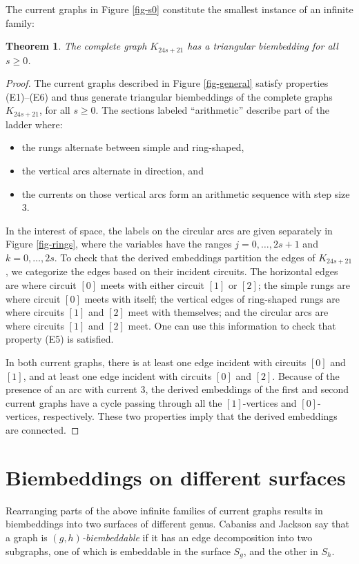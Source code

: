 \documentclass[12pt]{article}
\theoremstyle{plain}
\newtheorem{theorem}{Theorem}[section]
\begin{document}
The current graphs in Figure \ref{fig-s0} constitute the smallest instance of an infinite family:

\begin{theorem}
The complete graph $K_{24s+21}$ has a triangular biembedding for all $s \geq 0$.
\label{thm-main}
\end{theorem}
\begin{proof}
The current graphs described in Figure \ref{fig-general} satisfy properties (E1)--(E6) and thus generate triangular biembeddings of the complete graphs $K_{24s+21}$, for all $s \geq 0$. The sections labeled ``arithmetic'' describe part of the ladder where:
\begin{itemize}
\item the rungs alternate between simple and ring-shaped,
\item the vertical arcs alternate in direction, and
\item the currents on those vertical arcs form an arithmetic sequence with step size 3.
\end{itemize}
In the interest of space, the labels on the circular arcs are given separately in Figure \ref{fig-rings}, where the variables have the ranges $j = 0, \dotsc, 2s+1$ and $k = 0, \dotsc, 2s$. To check that the derived embeddings partition the edges of $K_{24s+21}$, we categorize the edges based on their incident circuits. The horizontal edges are where circuit $[0]$ meets with either circuit $[1]$ or $[2]$; the simple rungs are where circuit $[0]$ meets with itself; the vertical edges of ring-shaped rungs are where circuits $[1]$ and $[2]$ meet with themselves; and the circular arcs are where circuits $[1]$ and $[2]$ meet. One can use this information to check that property (E5) is satisfied.

In both current graphs, there is at least one edge incident with circuits $[0]$ and $[1]$, and at least one edge incident with circuits $[0]$ and $[2]$. Because of the presence of an arc with current $3$, the derived embeddings of the first and second current graphs have a cycle passing through all the $[1]$-vertices and $[0]$-vertices, respectively. These two properties imply that the derived embeddings are connected. 
\end{proof}

\section{Biembeddings on different surfaces}

Rearranging parts of the above infinite families of current graphs results in biembeddings into two surfaces of different genus. Cabaniss and Jackson \cite{CabanissJackson-Biembeddings} say that a graph is \emph{$(g,h)$-biembeddable} if it has an edge decomposition into two subgraphs, one of which is embeddable in the surface $S_g$, and the other in $S_h$.
\end{document}
